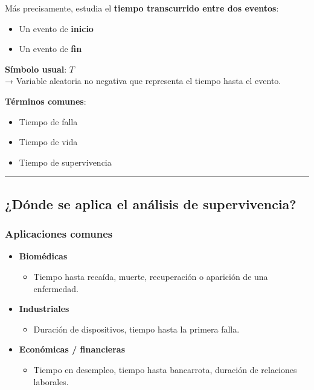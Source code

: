 \documentclass[
  letterpaper,
  DIV=11,
  numbers=noendperiod]{scrartcl}
\providecommand{\tightlist}{%
  \setlength{\itemsep}{0pt}\setlength{\parskip}{0pt}}
\begin{document}
Más precisamente, estudia el \textbf{tiempo transcurrido entre dos
eventos}:

\begin{itemize}
\tightlist
\item
  Un evento de \textbf{inicio}\\
\item
  Un evento de \textbf{fin}
\end{itemize}

\textbf{Símbolo usual}: \(T\)\\
→ Variable aleatoria no negativa que representa el tiempo hasta el
evento.

\textbf{Términos comunes}:

\begin{itemize}
\tightlist
\item
  Tiempo de falla
\item
  Tiempo de vida
\item
  Tiempo de supervivencia
\end{itemize}

\begin{center}\rule{0.5\linewidth}{0.5pt}\end{center}

\subsection{¿Dónde se aplica el análisis de
supervivencia?}\label{duxf3nde-se-aplica-el-anuxe1lisis-de-supervivencia}

\subsubsection{Aplicaciones comunes}\label{aplicaciones-comunes}

\begin{itemize}
\tightlist
\item
  \textbf{Biomédicas}

  \begin{itemize}
  \tightlist
  \item
    Tiempo hasta recaída, muerte, recuperación o aparición de una
    enfermedad.
  \end{itemize}
\item
  \textbf{Industriales}

  \begin{itemize}
  \tightlist
  \item
    Duración de dispositivos, tiempo hasta la primera falla.
  \end{itemize}
\item
  \textbf{Económicas / financieras}

  \begin{itemize}
  \tightlist
  \item
    Tiempo en desempleo, tiempo hasta bancarrota, duración de relaciones
    laborales.
  \end{itemize}
\end{itemize}
\end{document}
